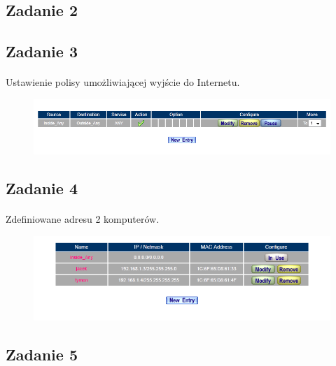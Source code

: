 \documentclass[wide,a4paper,titlepage,12pt] {article}
\begin{document}
  \subsection{Zadanie 2}


  \subsection{Zadanie 3}
  \paragraph{}
  Ustawienie polisy umożliwiającej wyjście do Internetu.
  \begin{figure}[h!]
    \begin{center}
      \includegraphics[width=\textwidth]{2.PNG}
    \end{center}
  \end{figure}



  \subsection{Zadanie 4}
  \paragraph{}
  Zdefiniowane adresu 2 komputerów.
  \begin{figure}[h!]
    \begin{center}
      \includegraphics[width=\textwidth]{3.PNG}
    \end{center}
  \end{figure}


  \subsection{Zadanie 5}
\end{document}
